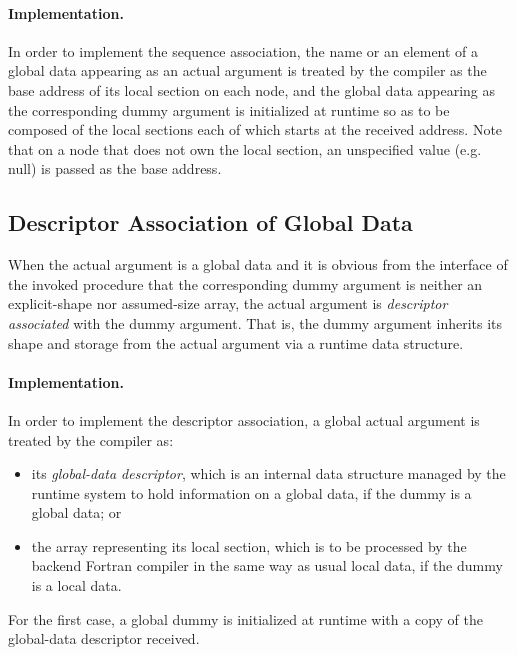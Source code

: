 \paragraph{Implementation.}

In order to implement the sequence association, the name or an element
of a global data appearing as an actual argument is treated by the
{\XMP} compiler as the base address of its local section on each node,
and the global data appearing as the corresponding dummy argument is
initialized at runtime so as to be composed of the local sections each
of which starts at the received address.
%
Note that on a node that does not own the local section, an unspecified
value (e.g. null) is passed as the base address.


\subsection{Descriptor Association of Global Data}

When the actual argument is a global data and it is obvious from the
interface of the invoked procedure that the corresponding dummy argument
is neither an explicit-shape nor assumed-size array, the actual
argument is {\it descriptor associated} with the dummy argument. That
is, the dummy argument inherits its shape and storage from the actual
argument via a runtime data structure.

\paragraph{Implementation.}

In order to implement the descriptor association, a global actual
argument is treated by the {\XMP} compiler as:

\begin{itemize}
 \item its {\it global-data descriptor}, which is an internal data
       structure managed by the {\XMP} runtime system to hold
       information on a global data, if the dummy is a global data; or
 \item the array representing its local section, which is to be processed
       by the backend Fortran compiler in the same way as usual local
       data, if the dummy is a local data.
\end{itemize}

For the first case, a global dummy is initialized at runtime with a copy
of the global-data descriptor received.


